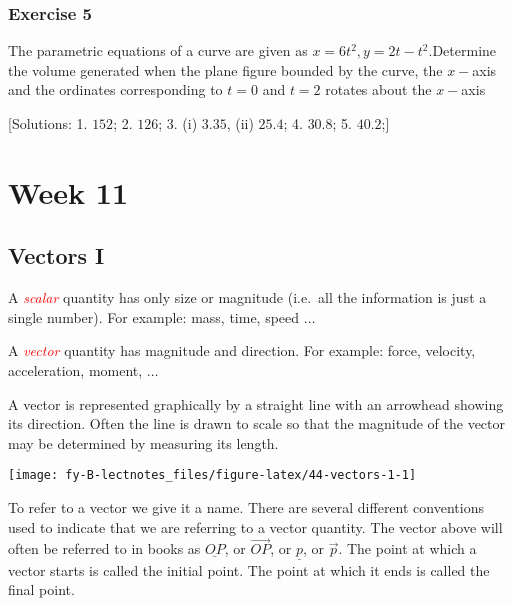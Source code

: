 \documentclass[
  11pt,
  oneside]{book}
\newcommand{\slide}{}
\theoremstyle{definition}
\theoremstyle{definition}
\theoremstyle{definition}
\theoremstyle{definition}
\theoremstyle{remark}
\begin{document}
\slide

\subsection*{Exercise 5}\label{exercise-5-5}

The parametric equations of a curve are given as \(x = 6t^2, y = 2t - t^2\).Determine the volume generated when the plane figure bounded by the curve, the \(x-\)axis and the ordinates corresponding to \(t = 0\) and \(t = 2\) rotates about the \(x-\)axis

{[}Solutions:
1. \(152\);
2. \(126\);
3. (i) \(3.35\), (ii) \(25.4\);
4. \(30.8\);
5. \(40.2\);{]}

\chapter{Week 11}\label{week-eleven}

\slide

\section{Vectors I}\label{vectors-i}

A \textcolor{red}{\em scalar} quantity has only size or magnitude (i.e.~all the information is just a single number). For example: mass, time, speed \(\dots\)

A \textcolor{red}{\em vector} quantity has magnitude and direction. For example: force, velocity, acceleration, moment, \(\dots\)

A vector is represented graphically by a straight line with an arrowhead showing its direction. Often the line is drawn to scale so that the magnitude of the vector may be determined by measuring its length.

\begin{center}\texttt{[image: fy-B-lectnotes\_files/figure-latex/44-vectors-1-1]} \end{center}
\slide

To refer to a vector we give it a name. There are several different conventions used to indicate that we are referring to a vector quantity. The vector above will often be referred to in books as \(\underline{OP}\), or \(\overrightarrow{OP}\), or \(\underline p\), or \(\vec{p}\). The point at which a vector starts is called the initial point. The point at which it ends is called the final point.
\end{document}
